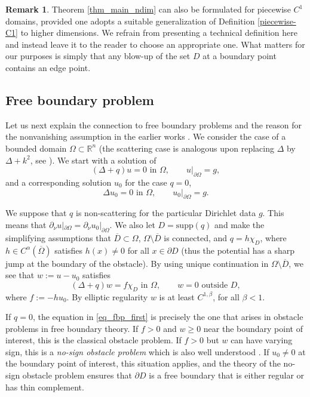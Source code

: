 \documentclass[11pt,a4paper]{amsart}
\theoremstyle{definition}
\newtheorem{Remark}[Theorem]{Remark}
\numberwithin{equation}{section}
\newcommand{\mR}{\mathbb{R}}                    %
\newcommand{\ol}[1]{\overline{#1}}
\newcommand{\supp}{\mathrm{supp}}
\newcommand{\p}{\partial}
\begin{document}
\begin{Remark}
Theorem \ref{thm_main_ndim} can also be formulated for piecewise $C^1$ domains, provided one adopts a suitable generalization of Definition \ref{piecewise-C1} to higher dimensions. We refrain from presenting a technical definition here and instead leave it to the reader to choose an appropriate one.
What matters for our purposes is simply that any blow-up of the set $D$ at a boundary point contains an edge point.
\end{Remark}


\subsection{Free boundary problem}

Let us next explain the connection to free boundary problems and the reason for the nonvanishing assumption in the earlier works \cite{CakoniVogelius, SaloShahgholian}. We consider the case of a bounded domain $\Omega \subset \mR^n$ (the scattering case is analogous upon replacing $\Delta$ by $\Delta+k^2$, see \cite{SaloShahgholian}). We start with a solution of 
\[
(\Delta+q)u = 0 \text{ in $\Omega$}, \qquad u|_{\p \Omega} = g, 
\]
and a corresponding solution $u_0$ for the case $q=0$,
\[
\Delta u_0 = 0 \text{ in $\Omega$}, \qquad u_0|_{\p \Omega} = g.
\]




We suppose that $q$ is non-scattering for the particular Dirichlet data $g$. This means that $\p_{\nu} u|_{\p \Omega} = \p_{\nu} u_0|_{\p \Omega}$. We also let $D = \supp(q)$ and make the simplifying assumptions that $\ol{D} \subset \Omega$, $\Omega \setminus \ol{D}$ is connected, and $q = h \chi_D$, where $h \in C^{\alpha}(\ol{\Omega})$ satisfies $h(x) \neq 0$ for all $x \in \p D$ (thus the potential has a sharp jump at the boundary of the obstacle). By using unique continuation in $\Omega \setminus \ol{D}$, we see that $w := u-u_0$ satisfies 
\begin{equation} \label{eq_fbp_first}
(\Delta+q)w = f \chi_D \text{ in $\Omega$}, \qquad w = 0 \text{ outside $D$},
\end{equation}
where $f := -h u_0$. By elliptic regularity $w$ is at least $C^{1,\beta}$, for all $\beta < 1$.



If $q=0$, the equation in \eqref{eq_fbp_first} is precisely the one that arises in obstacle problems in free boundary theory. If $f > 0$ and $w \geq 0$ near the boundary point of interest, this is the classical obstacle problem. If $f > 0$ but $w$ can have varying sign, this is a \emph{no-sign obstacle problem} which is also well understood \cite{PSU}. If $u_0 \neq 0$ at the boundary point of interest, this situation applies, and the theory of the no-sign obstacle problem ensures that $\p D$ is a free boundary that is either regular or has thin complement.
\end{document}
